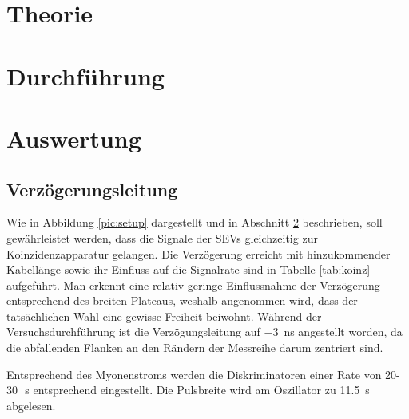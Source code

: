 

\section{Theorie}

\section{Durchführung}
\label{sec:exec}

\section{Auswertung}
\subsection{Verzögerungsleitung}
Wie in Abbildung \ref{pic:setup} dargestellt und in Abschnitt \ref{sec:exec} beschrieben, soll gewährleistet werden, dass die Signale der SEVs 
gleichzeitig zur Koinzidenzapparatur gelangen. Die Verzögerung erreicht mit hinzukommender Kabellänge sowie ihr Einfluss auf die Signalrate
sind in Tabelle \ref{tab:koinz} aufgeführt. Man erkennt eine relativ geringe Einflussnahme der Verzögerung entsprechend des breiten Plateaus,
weshalb angenommen wird, dass der tatsächlichen Wahl eine gewisse Freiheit beiwohnt. 
Während der Versuchsdurchführung ist die Verzögungsleitung auf \SI{-3}{\nano\second} angestellt worden, da die abfallenden Flanken an den 
Rändern der Messreihe darum zentriert sind. 
\begin{table}[b]

\caption{Verzögerungsleitung zur Synchronisierung der SEVs. Negative $t$ entsprechen einer Verzögerung des linken SEVs. In der dritten Spalte 
sind die Zählraten auf 10\,s Messzeit aufgeführt.}
\label{tab:koinz}
\end{table}
Entsprechend des Myonenstroms \cite{pdg} werden die Diskriminatoren einer Rate von 20-30\,\si{\per\second} \cite{Anl} entsprechend eingestellt. Die 
Pulsbreite wird am Oszillator zu \SI{11,5}{\s} abgelesen.
